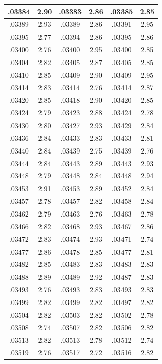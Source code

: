 \documentclass[11pt]{report}
\begin{document}
\begin{appendices}
\begin{longtable}{|c|c||c|c||c|c|}
.03384 & 2.90 & .03383 & 2.86 & .03385 & 2.85\\\hline
.03389 & 2.93 & .03389 & 2.86 & .03391 & 2.95\\\hline
.03395 & 2.77 & .03394 & 2.86 & .03395 & 2.86\\\hline
.03400 & 2.76 & .03400 & 2.95 & .03400 & 2.85\\\hline
.03404 & 2.82 & .03405 & 2.87 & .03405 & 2.85\\\hline
.03410 & 2.85 & .03409 & 2.90 & .03409 & 2.95\\\hline
.03414 & 2.83 & .03414 & 2.76 & .03414 & 2.87\\\hline
.03420 & 2.85 & .03418 & 2.90 & .03420 & 2.85\\\hline
.03424 & 2.79 & .03423 & 2.88 & .03424 & 2.78\\\hline
.03430 & 2.80 & .03427 & 2.93 & .03429 & 2.84\\\hline
.03436 & 2.84 & .03433 & 2.83 & .03433 & 2.81\\\hline
.03440 & 2.84 & .03439 & 2.75 & .03439 & 2.76\\\hline
.03444 & 2.84 & .03443 & 2.89 & .03443 & 2.93\\\hline
.03448 & 2.79 & .03448 & 2.84 & .03448 & 2.94\\\hline
.03453 & 2.91 & .03453 & 2.89 & .03452 & 2.84\\\hline
.03457 & 2.78 & .03457 & 2.82 & .03458 & 2.84\\\hline
.03462 & 2.79 & .03463 & 2.76 & .03463 & 2.78\\\hline
.03466 & 2.82 & .03468 & 2.93 & .03467 & 2.86\\\hline
.03472 & 2.83 & .03474 & 2.93 & .03471 & 2.74\\\hline
.03477 & 2.86 & .03478 & 2.85 & .03477 & 2.81\\\hline
.03482 & 2.85 & .03483 & 2.83 & .03483 & 2.83\\\hline
.03488 & 2.89 & .03489 & 2.92 & .03487 & 2.83\\\hline
.03493 & 2.76 & .03493 & 2.83 & .03493 & 2.83\\\hline
.03499 & 2.82 & .03499 & 2.82 & .03497 & 2.82\\\hline
.03504 & 2.82 & .03503 & 2.82 & .03502 & 2.78\\\hline
.03508 & 2.74 & .03507 & 2.82 & .03506 & 2.82\\\hline
.03513 & 2.82 & .03513 & 2.78 & .03512 & 2.74\\\hline
.03519 & 2.76 & .03517 & 2.72 & .03516 & 2.82\\\hline

\end{longtable}
\end{appendices}
\end{document}
